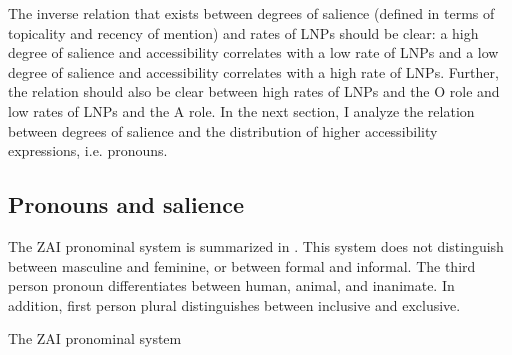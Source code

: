 The inverse relation that exists between degrees of salience (defined in terms of topicality and recency of mention) and rates of LNPs should be clear: a high degree of salience and accessibility correlates with a low rate of LNPs and a low degree of salience and accessibility correlates with a high rate of LNPs. Further, the relation should also be clear between high rates of LNPs and the O role and low rates of LNPs and the A role. In the next section, I analyze the relation between degrees of salience and the distribution of higher accessibility expressions, i.e. pronouns. 



\subsection{Pronouns and salience}\label{izpronouns}

The ZAI pronominal system is summarized in . This system does not distinguish between masculine and feminine, or between formal and informal. The third person pronoun differentiates between human, animal, and inanimate. In addition, first person plural distinguishes between inclusive and exclusive.

 
\ea\label{izpronounstable}  The ZAI pronominal system

